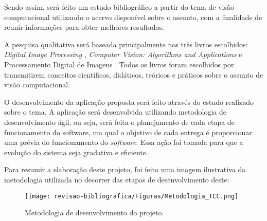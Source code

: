 Sendo assim, será feito um estudo bibliográfico a partir do tema de visão computacional utilizando o acervo disponível sobre o assunto, com a finalidade de reunir informações para obter melhores resultados.

A pesquisa qualitativa será baseada principalmente nos três livros escolhidos: \textit{Digital Image Processing} \cite{GONZALEZ2002},  \textit{Computer Vision: Algorithms and Applications} \cite{SZELISKI2010} e Processamento Digital de Imagens \cite{FILHO1999}. Todos os livros foram escolhidos por transmitirem conceitos científicos, didáticos, teóricos e práticos sobre o assunto de visão computacional.

O desenvolvimento da aplicação proposta será feito através do estudo realizado sobre o tema. A aplicação será desenvolvida utilizando metodologia de desenvolvimento ágil, ou seja, será feita o planejamento de cada etapa de funcionamento do software, ma qual o objetivo de cada entrega é proporcionar uma prévia do funcionamento do \textit{software}. Essa ação foi tomada para que a evolução do sistema seja gradativa e eficiente.

Para resumir a elaboração deste projeto, foi feito uma imagem ilustrativa da metodologia utilizada no decorrer das etapas de desenvolvimento deste:

\clearpage
\begin{figure}[!htb]
\caption{ {\footnotesize Metodologia de desenvolvimento do projeto.}}
 
\centering %
\texttt{[image: revisao-bibliografica/Figuras/Metodologia\_TCC.png]}%
\label{figura:figuraMet}

\centering {}
{
\label{figura:figura7}
}
\end{figure}